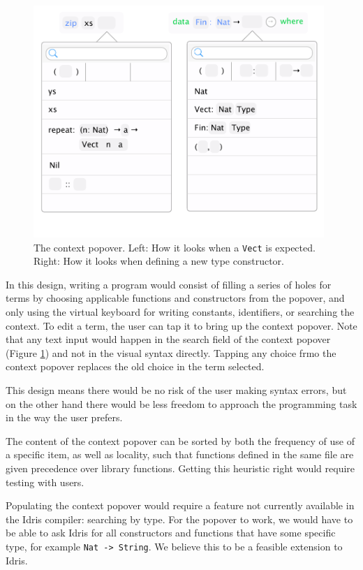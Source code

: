 \begin{figure}
	\centering
		\includegraphics[width=110mm]{diagrams/final_design_popover.pdf}
	\caption{The context popover. Left: How it looks when a \texttt{Vect} is
	expected. Right: How it looks when defining a new type constructor.}
\label{fig:new_design_popover}
\end{figure}

In this design, writing a program would consist of filling a series of holes for terms by choosing applicable functions and constructors from the popover, and only using the virtual keyboard for writing constants, identifiers, or searching
the context.
To edit a term, the user can tap it to bring up the context popover. Note that any text input would happen in the search field of the context popover (Figure \ref{fig:new_design_popover}) and
not in the visual syntax directly. Tapping any choice frmo the context popover replaces the old choice
in the term selected.

This design means there would be no risk of the user making syntax errors, but on the other hand there would be less freedom to approach the programming task in the way the user
prefers.

The content of the context popover can be sorted by both the frequency of use of a specific item, as well as locality, such that functions defined in the same file are given precedence over library functions.
Getting this heuristic right would require testing with users.

Populating the context popover would require a feature not currently available in the Idris compiler: searching by type.
For the popover to work, we would have to be able to ask Idris for all constructors and functions that have some specific type, for example \texttt{Nat -> String}.
We believe this to be a feasible extension to Idris. 


